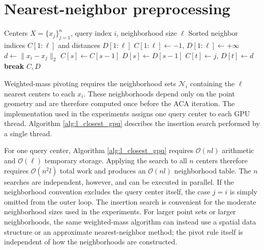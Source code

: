 \documentclass[11pt, preprint]{article}
\renewcommand{\O}{\mathcal{O}}
\newcommand{\algorithmicbreak}{\textbf{break}}
\begin{document}
\section{Nearest-neighbor preprocessing}
\label{apx:nearest-neighbor}
\begin{algorithm}[t]
\caption{Insertion search for the $\ell$ nearest centers to one query point}
\label{alg:l_closest_gpu}
\begin{algorithmic}[1]
\Require Centers $X=\{x_j\}_{j=1}^n$, query index $i$, neighborhood size $\ell$
\Ensure Sorted neighbor indices $C[1{:}\ell]$ and distances $D[1{:}\ell]$
\State $C[1{:}\ell]\gets-1$, $D[1{:}\ell]\gets+\infty$
    \State $d\gets\|x_i-x_j\|_2$
                \State $C[s]\gets C[s-1]$
                \State $D[s]\gets D[s-1]$
            \EndFor
            \State $C[t]\gets j$, $D[t]\gets d$
            \State \algorithmicbreak
        \EndIf
    \EndFor
\EndFor
\State \Return $C,D$
\end{algorithmic}
\end{algorithm}
Weighted-mass pivoting requires the neighborhood sets
$\mathcal N_i$ containing the $\ell$ nearest centers to each $x_i$. These
neighborhoods depend only on the point geometry and are therefore computed
once before the ACA iteration. The implementation used in the experiments
assigns one query center to each GPU thread. Algorithm
\ref{alg:l_closest_gpu} describes the insertion search performed by a single
thread. 

For one query center, Algorithm \ref{alg:l_closest_gpu} requires
$\O(nl)$ arithmetic and $\O(\ell)$ temporary storage. Applying the search to all $n$ centers therefore requires $\O(n^2l)$ total work and produces an $\O(nl)$ neighborhood table. The $n$ searches are independent, however, and can be executed in parallel. If the neighborhood convention excludes the query center itself, the case $j=i$ is simply omitted from the outer loop.  The insertion search is convenient for the moderate neighborhood sizes used in the experiments. For larger point sets or larger neighborhoods, the same weighted-mass algorithm can instead use a spatial data structure or an approximate nearest-neighbor method; the pivot rule itself is independent of how the neighborhoods are constructed.
\end{document}
